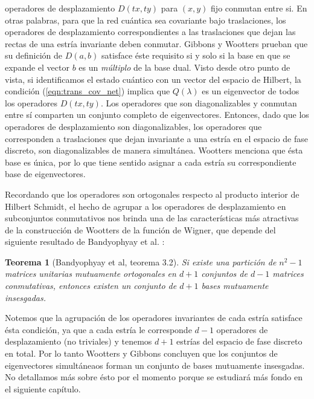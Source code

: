 \documentclass[a4paper,11pt]{report}
\newtheorem{theorem}{Teorema}
\begin{document}
  operadores de desplazamiento $D(tx,ty)$ para $(x,y)$ fijo
  conmutan entre si. En otras palabras, para que la red
  cuántica sea covariante bajo traslaciones, los operadores
  de desplazamiento correspondientes a las traslaciones que
  dejan las rectas de una estría invariante deben conmutar.
  Gibbons y Wootters prueban que su definición de $D(a,b)$
  satisface éste requisito si y solo si la base en que se
  expande el vector $b$ es un \textit{múltiplo} de la base
  dual. Visto desde otro punto de vista, si identificamos el
  estado cuántico con un vector del espacio de Hilbert, la
  condición (\ref{eqn:trans_cov_net}) implica que
  $Q(\lambda)$ es un eigenvector de todos los operadores
  $D(tx,ty)$. Los operadores que son diagonalizables y
  conmutan entre sí comparten un conjunto completo de
  eigenvectores. Entonces, dado que los operadores de
  desplazamiento son diagonalizables, los operadores que
  corresponden a traslaciones que dejan invariante a una
  estría en el espacio de fase discreto, son diagonalizables
  de manera simultánea. Wootters menciona que ésta base es
  única, por lo que tiene sentido asignar a cada estría su
  correspondiente base de eigenvectores.

  Recordando que los operadores son ortogonales respecto al
  producto interior de Hilbert Schmidt, el hecho de agrupar
  a los operadores de desplazamiento en subconjuntos
  conmutativos nos brinda una de las características más
  atractivas de la construcción de Wootters de la función de
  Wigner, que depende del siguiente resultado de Bandyophyay
  et al. \cite{bandyopadhyay2001}:
  \begin{theorem}[Bandyophyay et al, teorema 3.2]
    \label{thm:bandy}
    Si existe una partición de $n^2-1$ matrices unitarias
    mutuamente ortogonales en $d+1$ conjuntos de $d-1$
    matrices conmutativas, entonces existen un conjunto de
    $d+1$ bases mutuamente insesgadas.
  \end{theorem}
  Notemos que la agrupación de los operadores invariantes de
  cada estría satisface ésta condición, ya que a cada estría
  le corresponde $d-1$ operadores de desplazamiento (no
  triviales) y tenemos $d+1$ estrías del espacio de fase
  discreto en total. Por lo tanto Wootters y Gibbons
  concluyen que los conjuntos de eigenvectores simultáneaos
  forman un conjunto de bases mutuamente insesgadas. No
  detallamos más sobre ésto por el momento porque se
  estudiará más fondo en el siguiente capítulo.
\end{document}
